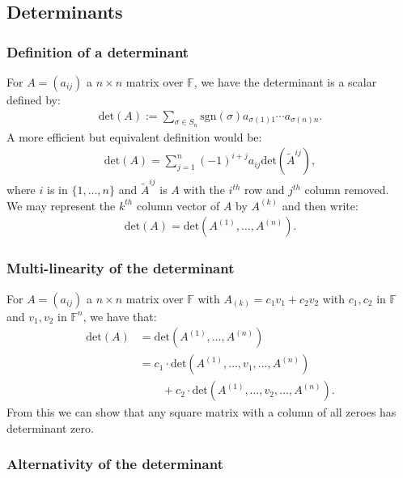 \documentclass[a4paper, 12pt, twoside]{article}
\begin{document}
\subsection{Determinants}

\subsubsection{Definition of a determinant}

For $A = (a_{ij})$ a $n \times n$ matrix over $\mathbb{F}$, we have
the determinant is a scalar defined by: \begin{gather*}
  \text{det}(A) := \sum_{\sigma \in S_n} \text{sgn}(\sigma)a_{\sigma(1)1} \cdots a_{\sigma(n)n}.
\end{gather*} A more efficient but equivalent definition would be: \begin{gather*}
  \text{det}(A) = \sum_{j = 1}^n (-1)^{i + j}a_{ij}\text{det}(\tilde{A}^{ij}),
\end{gather*} where $i$ is in $\{1, \ldots, n\}$ and $\tilde{A}^{ij}$ is $A$
with the $i^{th}$ row and $j^{th}$ column removed. 
\\[\baselineskip]
We may represent the $k^{th}$ column vector of $A$ by 
$A^{(k)}$ and then write: \begin{gather*}
  \text{det}(A) = \text{det}(A^{(1)}, \ldots, A^{(n)}).
\end{gather*}

\subsubsection{Multi-linearity of the determinant}

For $A = (a_{ij})$ a $n \times n$ matrix over $\mathbb{F}$ with
$A_{(k)} = c_1v_1 + c_2v_2$ with $c_1, c_2$ in $\mathbb{F}$ and
$v_1, v_2$ in $\mathbb{F}^n$, we have that: \begin{align*}
  \text{det}(A) &= \text{det}(A^{(1)}, \ldots, A^{(n)}) \\
  &= c_1 \cdot \text{det}(A^{(1)}, \ldots, v_1, \ldots, A^{(n)}) \\
  & \qquad + c_2 \cdot \text{det}(A^{(1)}, \ldots, v_2, \ldots, A^{(n)}).
\end{align*} From this we can show that any square matrix with a column
of all zeroes has determinant zero.

\subsubsection{Alternativity of the determinant}
\end{document}
